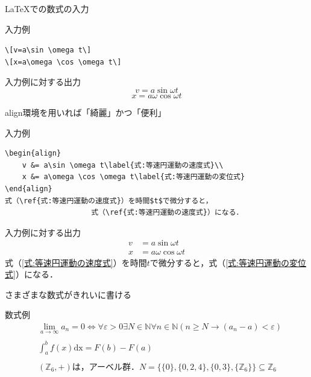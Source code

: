\documentclass[dvipdfmx]{beamer}
\begin{document}
\begin{frame}[fragile]{\LaTeX での数式の入力}
    \begin{exampleblock}{入力例}
        \begin{center}
\verb|\[v=a\sin \omega t\]|\\
\verb|\[x=a\omega \cos \omega t\]|
        \end{center}
    \end{exampleblock}
    \begin{exampleblock}{入力例に対する出力}
        \[v=a\sin \omega t\]
        \[x=a\omega \cos \omega t\]
    \end{exampleblock}
\end{frame}

\begin{frame}[fragile]{align環境を用いれば「綺麗」かつ「便利」}
    \begin{exampleblock}{入力例}
        \begin{verbatim}
\begin{align}
    v &= a\sin \omega t\label{式:等速円運動の速度式}\\
    x &= a\omega \cos \omega t\label{式:等速円運動の変位式}
\end{align}
式（\ref{式:等速円運動の速度式}）を時間$t$で微分すると，
                    式（\ref{式:等速円運動の速度式}）になる．
        \end{verbatim}
    \end{exampleblock}
    \begin{exampleblock}{入力例に対する出力}
        \begin{align}
            v &= a\sin \omega t\label{式:等速円運動の速度式}\\
            x &= a\omega \cos \omega t\label{式:等速円運動の変位式}
        \end{align}
        式（\ref{式:等速円運動の速度式}）を時間$t$で微分すると，式（\ref{式:等速円運動の変位式}）になる．
    \end{exampleblock}
\end{frame}
\begin{frame}{さまざまな数式がきれいに書ける}
    \begin{exampleblock}{数式例}
        \begin{align*}
            & \lim_{a\to \infty}a_n=0\Leftrightarrow\forall \varepsilon >0\exists N\in\mathbb{N}\forall n\in\mathbb{N}(n\geq N\to (a_n-a)<\varepsilon)\tag{1学年1Q：コーシーの収束の定義}\\\\
            & \int_{a}^{b}f(x)\textrm{dx}=F(b)-F(a)\tag{1学年3Q：微積分学の基本定理}\\\\
            & (\mathbb{Z}_6,+)\textrm{は，アーベル群．}N=\{\{0\},\{0,2,4\},\{0,3\},\{\mathbb{Z}_6\}\}\subseteq\mathbb{Z}_6 \tag{2学年1Q：代数学概論 群論 部分群}
        \end{align*}
    \end{exampleblock}
\end{frame}
\end{document}
